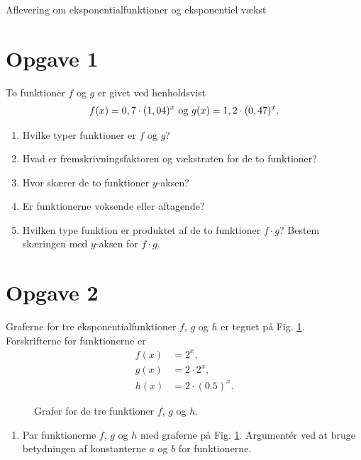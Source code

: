 \begin{center}
\Huge
Aflevering om eksponentialfunktioner og eksponentiel vækst
\end{center}
\section*{Opgave 1}
To funktioner $f$ og $g$ er givet ved henholdsvist
\begin{align*}
f(x) = 0,7 \cdot (1,04)^x \textnormal{ og } g(x) = 1,2 \cdot (0,47)^x.
\end{align*}
\begin{enumerate}[label=\roman*)]
\item Hvilke typer funktioner er $f$ og $g$? 
\item Hvad er fremskrivningsfaktoren og vækstraten for de to funktioner?
\item Hvor skærer de to funktioner $y$-aksen?
\item Er funktionerne voksende eller aftagende?
\item Hvilken type funktion er produktet af de to funktioner $f\cdot g$? Bestem skæringen med $y$-aksen for $f\cdot g$.
\end{enumerate}

\section*{Opgave 2}
Graferne for tre eksponentialfunktioner $f$, $g$ og $h$ er tegnet på Fig. \ref{fig:tregraf}. Forskrifterne for funktionerne er
\begin{align*}
f(x) &= 2^x,\\
g(x) &= 2\cdot 2^x,\\
h(x) &= 2\cdot(0.5)^x.
\end{align*}
\begin{figure}[H]
\centering
{}
\caption{Grafer for de tre funktioner $f$, $g$ og $h$.}
\label{fig:tregraf}
\end{figure}
\begin{enumerate}[label=\roman*)]
\item Par funktionerne $f$, $g$ og $h$ med graferne på Fig. \ref{fig:tregraf}. Argumentér ved at bruge betydningen af konstanterne $a$ og $b$ for funktionerne.
\end{enumerate}

